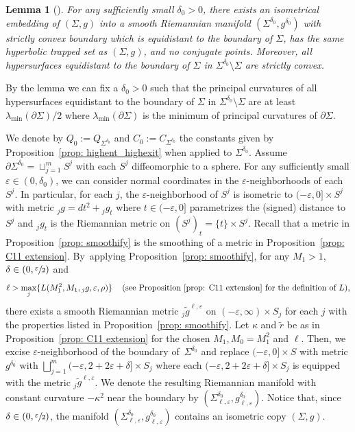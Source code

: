 \documentclass[JEP,XML,SOM,Unicode,NoFloatCountersInSection]{cedram}
\newtheorem{lemma}[theorem]{Lemma}
\theoremstyle{definition}
\let\eps\varepsilon
\renewcommand{\>}{{\rangle}}
\newcommand{\<}{{\langle}}
\begin{document}
\begin{lemma}[{\cite[Lem.\,2.3]{G17}}] \label{lem: extend_metric}
For any sufficiently small $\delta_0>0$, there exists an isometrical embedding of $(\Sigma, g)$ into a smooth Riemannian manifold $(\Sigma^{\delta_0}, g^{\delta_0})$ with strictly convex boundary which is equidistant to the boundary of $\Sigma$, has the same hyperbolic trapped set as $(\Sigma,g)$, and no conjugate points. Moreover, all hypersurfaces equidistant to the boundary of $\Sigma$ in $\Sigma^{\delta_0}\setminus \Sigma$ are strictly convex.
\end{lemma}

By the lemma we can fix a $\delta_0>0$ such that the principal curvatures of all hypersurfaces equidistant to the boundary of $\Sigma$ in $\Sigma^{\delta_0}\setminus \Sigma$ are at least $\lambda_{\min}(\partial\Sigma)/2$ where $\lambda_{\min}(\partial\Sigma)$ is the minimum of principal curvatures of $\partial\Sigma$.

We denote by $Q_0:=Q_{\Sigma^{\delta_0}}$ and $C_0:=C_{\Sigma^{\delta_0}}$ the constants given by Proposition~\ref{prop: highent_highexit} when applied to $\Sigma^{\delta_0}$.
Assume $\partial\Sigma^{\delta_0}=\sqcup_{j=1}^m S^j$ with each $S^j$ diffeomorphic to a sphere. For any sufficiently small { $\eps\in(0,\delta_0)$,} we can consider normal coordinates in the $\eps$-neighborhoods of each $S^j$. In particular, for each $j$, the $\eps$-neighborhood of $S^j$ is isometric to $(-\eps,0]\times S^j$ with metric ${}_jg=dt^2+{}_jg_t$ where $t\in(-\eps,0]$ parametrizes the (signed) distance to $S^j$ and ${}_jg_t$ is the Riemannian metric on $\left(S^j\right)_t=\{t\}\times S^j$. Recall that a metric in Proposition~\ref{prop: smoothify} is the smoothing of a metric in Proposition~\ref{prop: C11 extension}. By~applying Proposition~\ref{prop: smoothify}, for any $M_1>1$, $\delta\in(0,\sfrac{\eps}{2})$ and
\begin{equation}\label{cond: collar_curv}
\ell>\max_{j}\{L(M_1^2,M_1, {}_jg, \eps, \rho)\} \quad \,\text{(see Proposition~\ref{prop: C11 extension} for the definition of $L$),}
\end{equation}
there exists a smooth Riemannian metric ${}_j\tilde g^{\ell,\eps}$ on $(-\eps,\infty)\times S_j$ for each $j$ with the properties listed in Proposition~\ref{prop: smoothify}. Let $\kappa$ and $\tilde r$ be as in Proposition~\ref{prop: C11 extension} for the chosen $M_1, M_0=M_1^2$ and $\ell$. Then, we excise $\eps$-neighborhood of the boundary of~$\Sigma^{\delta_0}$ and replace $(-\eps,0]\times S$ with metric $g^{\delta_0}$ with $\bigsqcup_{j=1}^m(-\eps, 2+2\eps+\delta]\times S_j$ where each $(-\eps, 2+2\eps+\delta]\times S_j$ is equipped with the metric ${}_j\tilde g^{\ell,\eps}$. We denote the resulting Riemannian manifold with constant curvature $-\kappa^2$ near the boundary by $(\Sigma^{\delta_0}_{\ell,\eps}, g^{\delta_0}_{\ell,\eps})$. Notice that, since $\delta\in(0,\sfrac{\eps}{2})$, the manifold $(\Sigma^{\delta_0}_{\ell,\eps}, g^{\delta_0}_{\ell,\eps})$ contains an isometric copy $(\Sigma,g)$.
\end{document}
